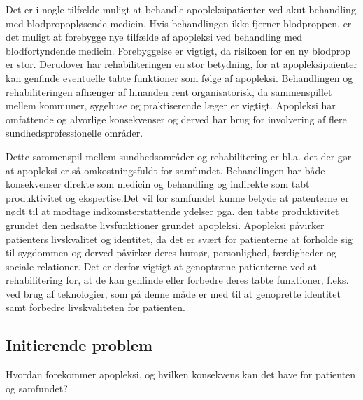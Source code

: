 Det er i nogle tilfælde muligt at behandle apopleksipatienter ved akut behandling med blodpropopløsende medicin. Hvis behandlingen ikke fjerner blodproppen, er det muligt at forebygge nye tilfælde af apopleksi ved behandling med blodfortyndende medicin.\cite{Hjerteforeningen2014} \cite{Kruuse2014a} Forebyggelse er vigtigt, da risikoen for en ny blodprop er stor. Derudover har rehabiliteringen en stor betydning, for at apopleksipaienter kan genfinde eventuelle tabte funktioner som følge af apopleksi.\cite{Kjaergaard2015} Behandlingen og rehabiliteringen afhænger af hinanden rent organisatorisk, da sammenspillet mellem kommuner, sygehuse og praktiserende læger er vigtigt. Apopleksi har omfattende og alvorlige konsekvenser og derved har brug for involvering af flere sundhedsprofessionelle områder.\cite{Sundhedsstyrelsen2010}

Dette sammenspil mellem sundhedsområder og rehabilitering er bl.a. det der gør at apopleksi er så omkostningsfuldt for samfundet. Behandlingen har både konsekvenser direkte som medicin og behandling og indirekte som tabt produktivitet og ekspertise.Det vil for samfundet kunne betyde at patenterne er nødt til at modtage indkomsterstattende ydelser pga. den tabte produktivitet grundet den nedsatte livsfunktioner grundet apopleksi.\cite{Sundhedsstyrelsen2010} 
Apopleksi påvirker patienters livskvalitet og identitet, da det er svært for patienterne at forholde sig til sygdommen og derved påvirker deres humør, personlighed, færdigheder og sociale relationer. Det er derfor vigtigt at genoptræne patienterne ved at rehabilitering for, at de kan genfinde eller forbedre deres tabte funktioner, f.eks. ved brug af teknologier, som på denne måde er med til at genoprette identitet samt forbedre livskvaliteten for patienten.\cite{Sundhedsstyrelsen2010}  

\subsection{Initierende problem}
Hvordan forekommer apopleksi, og hvilken konsekvens kan det have for patienten og samfundet?